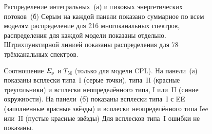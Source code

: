\begin{figure}
    \begin{minipage}[h]{0.5\textwidth}
    \end{minipage}
    \hfill
    \begin{minipage}[h]{0.5\textwidth}
	\end{minipage}
\caption{
    Распределение интегральных~(а) и пиковых энергетических потоков~(б)
    Серым на каждой панели показано суммарное по всем моделям распределение для 216
    многоканальных спектров, распределения для каждой модели показаны отдельно. 
    Штрихпунктирной линией показаны распределения для 78 трёхканальных спектров.
    \label{fig:fl_pf_dist} }
\end{figure}

\begin{figure}
    \begin{minipage}[h]{0.5\textwidth}
    \end{minipage}
    \hfill
    \begin{minipage}[h]{0.5\textwidth}
	\end{minipage}

\caption{
    Соотношение $E_{\mathrm{p}}$ и $T_{50}$ (только для модели CPL).
    На панели~(а) показаны всплески типа~I (серые точки), типа~II (красные треугольники)
    и всплески неопределённого типа, I или~II (синие окружности).
    На панели~(б) показаны всплески типа~I с EE (заполненные красные звёзды)
    и всплески неопределённого типа Iee или~II (пустые красные звёзды)
    Для всплесков типа~I ошибки не показаны. 
    \label{fig:EpT50}}
\end{figure}

